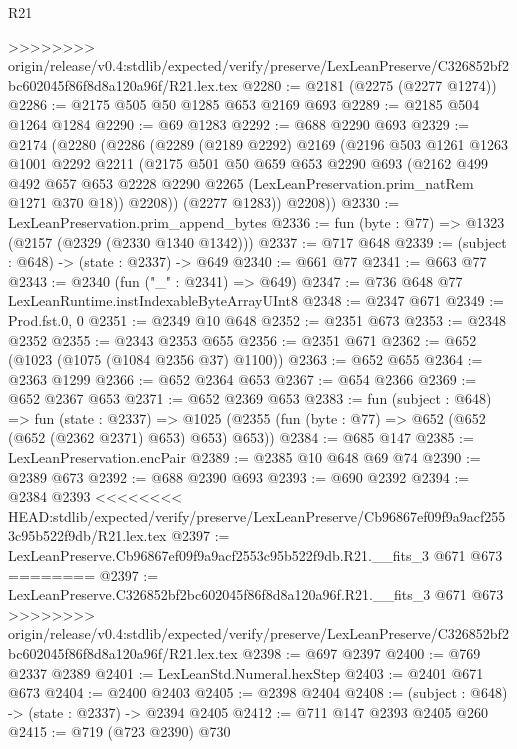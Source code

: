 \begin{lexlean}{R21}
\begin{coremodule}
{{{{{{{{{{{{{{{>>>>>>>> origin/release/v0.4:stdlib/expected/verify/preserve/LexLeanPreserve/C326852bf2bc602045f86f8d8a120a96f/R21.lex.tex
@2280 := @2181 (@2275 (@2277 @1274))
@2286 := @2175 @505 @50 @1285 @653 @2169 @693
@2289 := @2185 @504 @1264 @1284
@2290 := @69 @1283
@2292 := @688 @2290 @693
@2329 := @2174
    (@2280
      (@2286
        (@2289
          (@2189 @2292)
          @2169
          (@2196
            @503
            @1261
            @1263
            @1001
            @2292
            @2211
            (@2175
              @501
              @50
              @659
              @653
              @2290
              @693
              (@2162
                @499
                @492
                @657
                @653
                @2228
                @2290
                @2265
                (LexLeanPreservation.prim_natRem @1271 @370 @18))
              @2208))
          (@2277 @1283))
        @2208))
@2330 := LexLeanPreservation.prim_append_bytes
@2336 := fun (byte : @77) => @1323 (@2157 (@2329 (@2330 @1340 @1342)))
@2337 := @717 @648
@2339 := (subject : @648) -> (state : @2337) -> @649
@2340 := @661 @77
@2341 := @663 @77
@2343 := @2340 (fun ("_" : @2341) => @649)
@2347 := @736 @648 @77 LexLeanRuntime.instIndexableByteArrayUInt8
@2348 := @2347 @671
@2349 := Prod.fst.{0, 0}
@2351 := @2349 @10 @648
@2352 := @2351 @673
@2353 := @2348 @2352
@2355 := @2343 @2353 @655
@2356 := @2351 @671
@2362 := @652 (@1023 (@1075 (@1084 @2356 @37) @1100))
@2363 := @652 @655
@2364 := @2363 @1299
@2366 := @652 @2364 @653
@2367 := @654 @2366
@2369 := @652 @2367 @653
@2371 := @652 @2369 @653
@2383 := fun (subject : @648) =>
  fun (state : @2337) =>
  @1025 (@2355 (fun (byte : @77) => @652 (@652 (@652 (@2362 @2371) @653) @653) @653))
@2384 := @685 @147
@2385 := LexLeanPreservation.encPair
@2389 := @2385 @10 @648 @69 @74
@2390 := @2389 @673
@2392 := @688 @2390 @693
@2393 := @690 @2392
@2394 := @2384 @2393
<<<<<<<< HEAD:stdlib/expected/verify/preserve/LexLeanPreserve/Cb96867ef09f9a9acf2553c95b522f9db/R21.lex.tex
@2397 := LexLeanPreserve.Cb96867ef09f9a9acf2553c95b522f9db.R21.__fits_3 @671 @673
========
@2397 := LexLeanPreserve.C326852bf2bc602045f86f8d8a120a96f.R21.__fits_3 @671 @673
>>>>>>>> origin/release/v0.4:stdlib/expected/verify/preserve/LexLeanPreserve/C326852bf2bc602045f86f8d8a120a96f/R21.lex.tex
@2398 := @697 @2397
@2400 := @769 @2337 @2389
@2401 := LexLeanStd.Numeral.hexStep
@2403 := @2401 @671 @673
@2404 := @2400 @2403
@2405 := @2398 @2404
@2408 := (subject : @648) -> (state : @2337) -> @2394 @2405
@2412 := @711 @147 @2393 @2405 @260
@2415 := @719 (@723 @2390) @730
}}}}}}}}}}}}}}}
\end{coremodule}
\end{lexlean}
